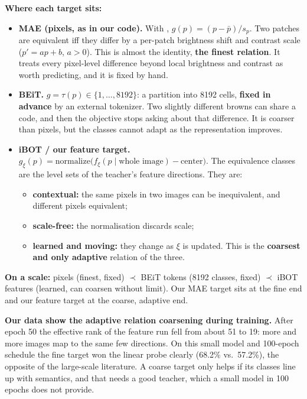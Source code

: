 \documentclass[11pt]{article}
\newcommand{\run}[1]{\texttt{\detokenize{#1}}}
\begin{document}
\textbf{Where each target sits:}
\begin{itemize}
  \item \textbf{MAE (pixels, as in our code).} With \run{norm_pix}, $g(p)=(p-\bar p)/s_p$. Two patches are equivalent iff they differ by a per-patch brightness shift and contrast scale ($p'=ap+b$, $a>0$). This is almost the identity, \textbf{the finest relation}. It treats every pixel-level difference beyond local brightness and contrast as worth predicting, and it is fixed by hand.
  \item \textbf{BEiT.} $g=\tau(p)\in\{1,\dots,8192\}$: a partition into 8192 cells, \textbf{fixed in advance} by an external tokenizer. Two slightly different browns can share a code, and then the objective stops asking about that difference. It is coarser than pixels, but the classes cannot adapt as the representation improves.
  \item \textbf{iBOT / our feature target.} $g_\xi(p)=\mathrm{normalize}\big(f_\xi(p\mid\text{whole image})-\text{center}\big)$. The equivalence classes are the level sets of the teacher's feature directions. They are:
  \begin{itemize}
    \item \textbf{contextual:} the same pixels in two images can be inequivalent, and different pixels equivalent;
    \item \textbf{scale-free:} the normalisation discards scale;
    \item \textbf{learned and moving:} they change as $\xi$ is updated. This is the \textbf{coarsest and only adaptive} relation of the three.
  \end{itemize}
\end{itemize}

\textbf{On a scale:} pixels (finest, fixed) $\prec$ BEiT tokens (8192 classes, fixed) $\prec$ iBOT features (learned, can coarsen without limit). Our MAE target sits at the fine end and our feature target at the coarse, adaptive end.

\textbf{Our data show the adaptive relation coarsening during training.} After epoch 50 the effective rank of the feature run fell from about 51 to 19: more and more images map to the same few directions. On this small model and 100-epoch schedule the fine target won the linear probe clearly (68.2\% vs.\ 57.2\%), the opposite of the large-scale literature. A coarse target only helps if its classes line up with semantics, and that needs a good teacher, which a small model in 100 epochs does not provide.
\end{document}
